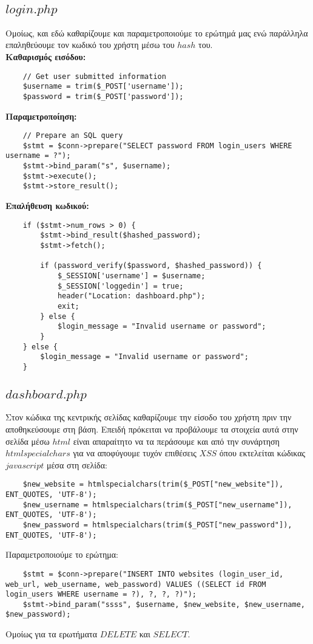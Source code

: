 \documentclass{report}
\begin{document}
\subsection*{$login.php$}
Ομοίως, και εδώ καθαρίζουμε και παραμετροποιούμε το ερώτημά μας ενώ παράλληλα επαληθεύουμε
τον κωδικό του χρήστη μέσω του $hash$ του.\\
\textbf{Καθαρισμός εισόδου:}
\begin{verbatim}
    // Get user submitted information
    $username = trim($_POST['username']);
    $password = trim($_POST['password']);
\end{verbatim}
\textbf{Παραμετροποίηση:}
\begin{verbatim}
    // Prepare an SQL query
    $stmt = $conn->prepare("SELECT password FROM login_users WHERE username = ?");
    $stmt->bind_param("s", $username);
    $stmt->execute();
    $stmt->store_result();
\end{verbatim}
\textbf{Επαλήθευση κωδικού:}
\begin{verbatim}
    if ($stmt->num_rows > 0) {
        $stmt->bind_result($hashed_password);
        $stmt->fetch();

        if (password_verify($password, $hashed_password)) {
            $_SESSION['username'] = $username;
            $_SESSION['loggedin'] = true;
            header("Location: dashboard.php");
            exit;
        } else {
            $login_message = "Invalid username or password";
        }
    } else {
        $login_message = "Invalid username or password";
    }
\end{verbatim}
\subsection*{$dashboard.php$}
Στον κώδικα της κεντρικής σελίδας καθαρίζουμε την είσοδο του χρήστη πριν την αποθηκεύσουμε στη βάση.
Επειδή πρόκειται να προβάλουμε τα στοιχεία αυτά στην σελίδα μέσω $html$ είναι απαραίτητο να τα περάσουμε 
και από την συνάρτηση $htmlspecialchars$ για να αποφύγουμε τυχόν επιθέσεις $XSS$ όπου εκτελείται κώδικας
$javascript$ μέσα στη σελίδα:
\begin{verbatim}
    $new_website = htmlspecialchars(trim($_POST["new_website"]), ENT_QUOTES, 'UTF-8');
    $new_username = htmlspecialchars(trim($_POST["new_username"]), ENT_QUOTES, 'UTF-8');
    $new_password = htmlspecialchars(trim($_POST["new_password"]), ENT_QUOTES, 'UTF-8');
\end{verbatim}
Παραμετροποιούμε το ερώτημα:
\begin{verbatim}
    $stmt = $conn->prepare("INSERT INTO websites (login_user_id, web_url, web_username, web_password) VALUES ((SELECT id FROM login_users WHERE username = ?), ?, ?, ?)");
    $stmt->bind_param("ssss", $username, $new_website, $new_username, $new_password);
\end{verbatim}
Ομοίως για τα ερωτήματα $DELETE$ και $SELECT$.
\end{document}
